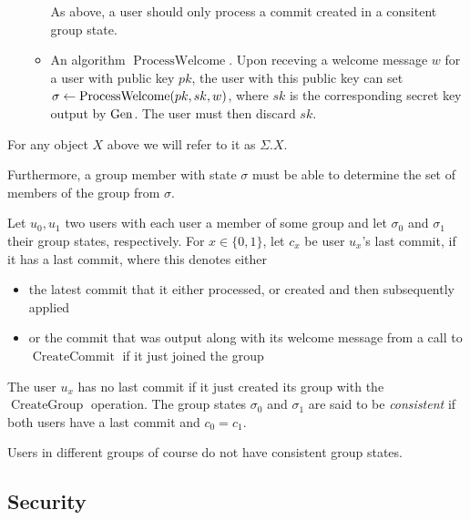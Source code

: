 \begin{definition}[CGKA]
\begin{enumerate}[1.]
\begin{itemize}
				      As above, a user should only process a commit created in a consitent group state.
				\item An algorithm $\operatorname{ProcessWelcome}$. Upon receving a welcome message $w$ for a user with public key $pk$, the user with this public key can set $\sigma \leftarrow \operatorname{ProcessWelcome}(pk, sk, w)$, where $sk$ is the corresponding secret key output by $\mathrm{Gen}$. The user must then discard $sk$.
			\end{itemize}
	\end{enumerate}
	For any object $X$ above we will refer to it as $\Sigma.X$.

	Furthermore, a group member with state $\sigma$ must be able to determine the set of members of the group from $\sigma$.
\end{definition}

\begin{definition} \label{def:consistent-group-state}
	Let $u_0, u_1$ two users with each user a member of some group and let $\sigma_0$ and $\sigma_1$ their group states, respectively. For $x \in \{0, 1\}$, let $c_x$ be user $u_x$'s last commit, if it has a last commit, where this denotes either
	\begin{itemize}
		\item the latest commit that it either processed, or created and then subsequently applied
		\item or the commit that was output along with its welcome message from a call to $\operatorname{CreateCommit}$ if it just joined the group
	\end{itemize}
	The user $u_x$ has no last commit if it just created its group with the $\operatorname{CreateGroup}$ operation. The group states $\sigma_0$ and $\sigma_1$ are said to be \emph{consistent} if both users have a last commit and $c_0 = c_1$.
\end{definition}

Users in different groups of course do not have consistent group states.


\subsection{Security}

